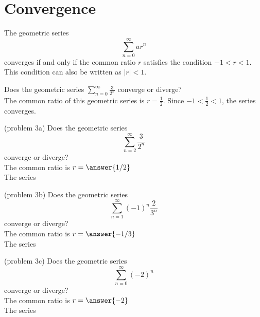 \documentclass[handout]{ximera}
\begin{document}
 
\section{Convergence}

\begin{theorem} 
The geometric series
\[
\sum_{n=0}^\infty ar^n
\]
converges if and only if the common ratio $r$ satisfies the condition $-1 < r < 1$.
This condition can also be written as $|r| < 1$.
\end{theorem}

\begin{example}[example 3]
Does the geometric series $\displaystyle{\sum_{n=0}^\infty \frac{3}{2^n}}$ converge or diverge?\\
The common ratio of this geometric series is $r = \frac12$. Since $-1 < \frac 12 < 1$,
the series converges.
\end{example}


\begin{problem}(problem 3a)
 Does the geometric series
 \[
 \sum_{n=2}^\infty \frac{3}{2^n} 
 \]
 converge or diverge?\\
 The common ratio is $r = \answer{1/2}$\\
 The series
 \begin{multipleChoice}
 \end{multipleChoice}
 \end{problem}
 

\begin{problem}(problem 3b)
 Does the geometric series
 \[
 \sum_{n=1}^\infty (-1)^n\frac{2}{3^n} 
 \]
 converge or diverge?\\
 The common ratio is $r = \answer{-1/3}$\\
 The series
 \begin{multipleChoice}
 \end{multipleChoice}
 \end{problem}
 
 \begin{problem}(problem 3c)
 Does the geometric series
 \[
 \sum_{n=0}^\infty (-2)^n 
 \]
 converge or diverge?\\
 The common ratio is $r = \answer{-2}$\\
 The series
 \begin{multipleChoice}
 \end{multipleChoice}
 \end{problem}
 
\end{document}

